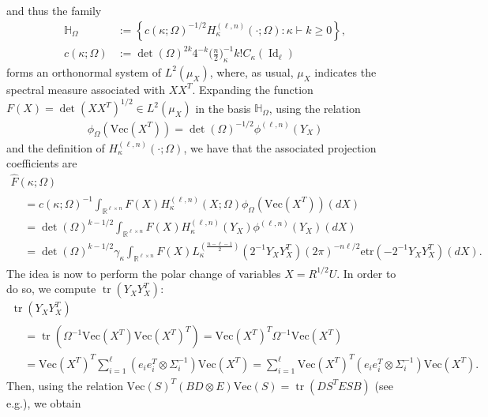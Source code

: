 \documentclass[10pt]{amsart}
\theoremstyle{definition}\newtheorem{defi}[theo]{Definition}\newtheorem{rema}[theo]{Remark}\newtheorem{exam}[theo]{Example}\newtheorem{exem}[theo]{Example}\newtheorem{nota}[theo]{Notation}
\DeclareMathOperator{\Id}{Id}
\DeclareMathOperator{\Tr}{tr}
\renewcommand{\Vec}{\mathrm{Vec}}
\newcommand{\R}{\mathbb{R}}
\newcommand{\bbH}{\mathbb{H}}
\newcommand{\etr}[1]{\mathrm{etr}\left(#1\right)}
\begin{document}
and thus the family
\begin{align*}
\bbH_{\Omega} &{:=} \left\{ c(\kappa;\Omega)^{-1/2} H_{\kappa}^{(\ell,n)}(\cdot;\Omega): \kappa \vdash k \geq0\right\}, \\
 c(\kappa;\Omega) &{:=}\det(\Omega)^{2 k}4^{-k}\bigg(\frac{n}{2}\bigg)_{\kappa}^{-1} k!C_{\kappa}(\Id_{\ell})
\end{align*}
forms an orthonormal system of $L^2(\mu_{X})$, where, as usual, $\mu_{X}$ indicates the spectral measure associated with $XX^T$. Expanding the function $F(X)=\det(XX^T)^{1/2} \in L^2(\mu_{X})$ in the basis $\bbH_{\Omega}$, using the relation
\begin{gather*}
\phi_{\Omega}\left(\Vec\left(X^T\right)\right) = \det(\Omega)^{-1/2} \phi^{(\ell,n)}(Y_X)
\end{gather*}
and the definition of $H_{\kappa}^{(\ell,n)}(\cdot; \Omega)$, we have that the associated projection coefficients are
\begin{multline*}
\widehat{F}(\kappa;\Omega)\\
\begin{aligned}
&= c(\kappa;\Omega)^{-1}
\int_{\R^{\ell \times n}} F(X) H^{(\ell,n)}_{\kappa}(X;\Omega) \phi_{\Omega}\left(\Vec\left(X^T\right)\right) (dX) \\
&= \det(\Omega)^{k-1/2} \int_{\R^{\ell \times n}} F(X) H_{\kappa}^{(\ell,n)}(Y_X) \phi^{(\ell,n)}(Y_X) (dX)\\
&= \det(\Omega)^{k-1/2} \gamma_{\kappa}
\int_{\R^{\ell \times n}} F(X) L_{\kappa}^{(\frac{n-\ell-1}{2})}\left(2^{-1}Y_XY_X^T\right) (2\pi)^{-n\ell/2}\etr{-2^{-1}Y_XY_X^T} (dX).
\end{aligned}
\end{multline*}
The idea is now to perform the polar change of variables $X= R^{1/2}U$. In order to do so, we compute $\Tr(Y_XY_X^T)$:
\begin{multline*}
\Tr\left(Y_XY_X^T\right)\\
\begin{aligned}
&= \Tr\left(\Omega^{-1} \Vec\left(X^T\right)\Vec\left(X^T\right)^T\right) = \Vec\left(X^T\right)^T \Omega^{-1} \Vec\left(X^T\right) \\
&= \Vec\left(X^T\right)^T \sum_{i=1}^{\ell} \left(e_ie_i^T \otimes \Sigma_i^{-1}\right) \Vec\left(X^T\right) = \sum_{i=1}^{\ell}\Vec\left(X^T\right)^T \left(e_ie_i^T \otimes \Sigma_i^{-1}\right) \Vec\left(X^T\right).
\end{aligned}
\end{multline*}
Then, using the relation $\Vec(S)^T (BD\otimes E) \Vec(S)=\Tr(DS^TESB)$ (see e.g.\linebreak \cite[Theorem~1.2.22]{Gupta2018}), we obtain
\end{document}
